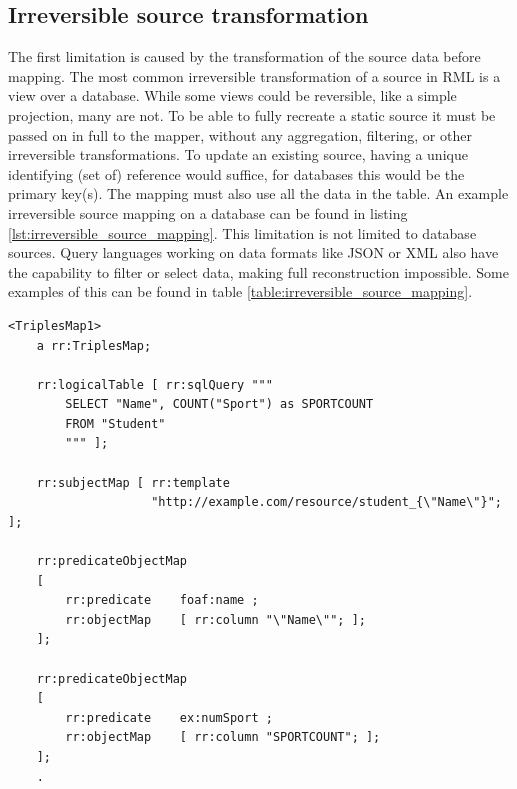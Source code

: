 \subsection{Irreversible source transformation}
\label{subsection:irreversible_source_transformation}
The first limitation is caused by the transformation of the source data before mapping. The most common irreversible transformation of a source in RML is a view over a database. While some views could be reversible, like a simple projection, many are not. To be able to fully recreate a static source it must be passed on in full to the mapper, without any aggregation, filtering, or other irreversible transformations. To update an existing source, having a unique identifying (set of) reference would suffice, for databases this would be the primary key(s). The mapping must also use all the data in the table. An example irreversible source mapping on a database can be found in listing \ref{lst:irreversible_source_mapping}. This limitation is not limited to database sources. Query languages working on data formats like JSON or XML also have the capability to filter or select data, making full reconstruction impossible. Some examples of this can be found in table \ref{table:irreversible_source_mapping}.

\begin{lstlisting}[caption={Irreversible source mapping from R2RML Test cases}, label={lst:irreversible_source_mapping}, captionpos=b, basicstyle=\small, frame=single]
<TriplesMap1>
    a rr:TriplesMap;
        
    rr:logicalTable [ rr:sqlQuery """
        SELECT "Name", COUNT("Sport") as SPORTCOUNT
        FROM "Student"
        """ ];

    rr:subjectMap [ rr:template 
                    "http://example.com/resource/student_{\"Name\"}"; ]; 

    rr:predicateObjectMap
    [ 
        rr:predicate	foaf:name ; 
        rr:objectMap	[ rr:column "\"Name\""; ];
    ];

    rr:predicateObjectMap
    [ 
		rr:predicate	ex:numSport ; 
		rr:objectMap	[ rr:column "SPORTCOUNT"; ];
    ];
    .
\end{lstlisting}

